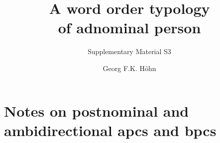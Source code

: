 \documentclass[A4paper]{article}
\let\OGtableofcontents\tableofcontents
\begin{document}
  \articletype{}

  \author[1]{Georg F.K. Höhn} 
  \title{A word order typology\\of adnominal person}
  \subtitle{Supplementary Material S3}


\maketitle




 


\section{Notes on postnominal and ambidirectional \glspl{apc} and \glspl{bpc}}
\end{document}
